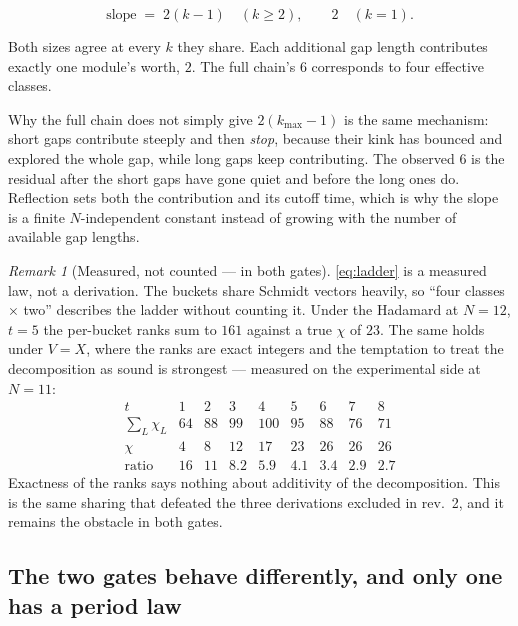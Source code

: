 \documentclass[11pt]{article}
\theoremstyle{plain}
\theoremstyle{remark}
\newtheorem{remark}{Remark}
\begin{document}
\begin{equation}
  \text{slope} \;=\; 2(k-1) \quad (k\ge2), \qquad 2 \quad (k=1).
  \label{eq:ladder}
\end{equation}

\noindent Both sizes agree at every $k$ they share. Each additional gap length
contributes exactly one module's worth, $2$. The full chain's $6$ corresponds to
four effective classes.

Why the full chain does not simply give $2(k_{\max}-1)$ is the same mechanism:
short gaps contribute steeply and then \emph{stop}, because their kink has
bounced and explored the whole gap, while long gaps keep contributing. The
observed $6$ is the residual after the short gaps have gone quiet and before the
long ones do. Reflection sets both the contribution and its cutoff time, which is
why the slope is a finite $N$-independent constant instead of growing with the
number of available gap lengths.

\begin{remark}[Measured, not counted --- in both gates]
\eqref{eq:ladder} is a measured law, not a derivation. The buckets share Schmidt
vectors heavily, so ``four classes $\times$ two'' describes the ladder without
counting it. Under the Hadamard at $N=12$, $t=5$ the per-bucket ranks sum to
$161$ against a true $\chi$ of $23$. The same holds under $V=X$, where the ranks
are exact integers and the temptation to treat the decomposition as sound is
strongest --- measured on the experimental side at $N=11$:
\[
\begin{array}{l|cccccccc}
t & 1 & 2 & 3 & 4 & 5 & 6 & 7 & 8\\\hline
\textstyle\sum_L \chi_L & 64 & 88 & 99 & 100 & 95 & 88 & 76 & 71\\
\chi & 4 & 8 & 12 & 17 & 23 & 26 & 26 & 26\\
\text{ratio} & 16 & 11 & 8.2 & 5.9 & 4.1 & 3.4 & 2.9 & 2.7
\end{array}
\]
Exactness of the ranks says nothing about additivity of the decomposition. This
is the same sharing that defeated the three derivations excluded in rev.\ 2, and
it remains the obstacle in both gates.
\end{remark}

\subsection{The two gates behave differently, and only one has a period law}
\end{document}
